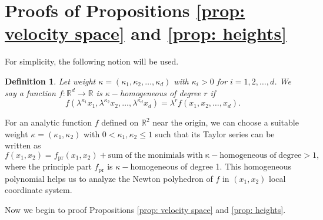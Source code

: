\documentclass[12pt]{amsart}
\newtheorem{definition}{Definition}[section]
\newcommand{\R}{\mathbb{R}}
\begin{document}
   


 



 \section{Proofs of Propositions \ref{prop: velocity space} and \ref{prop: heights}}\label{sec3}

For simplicity, the following notion will be used.
\begin{definition}
	Let weight $\kappa=\left(\kappa_{1},\kappa_{2},\dots,\kappa_{d}\right)$ with $\kappa_{i}>0$ for $i=1,2,\dots,d$. We say a function $f:\R^{d}\to\R$ is $\kappa-$homogeneous of degree $r$ if
    \begin{equation*}
		f\left(\lambda^{\kappa_{1}}x_{1},\lambda^{\kappa_{2}}x_{2},\dots,\lambda^{\kappa_{d}}x_{d}\right)=\lambda^{r}f\left(x_{1},x_{2},\dots,x_{d}\right).
	\end{equation*}
\end{definition}
For an analytic function $f$ defined on $\R^{2}$ near the origin, we can choose a suitable weight $\kappa=\left(\kappa_{1},\kappa_{2}\right)$ with $0<\kappa_{1},\kappa_{2}\leq1$ such that its Taylor series can be written as
\begin{equation*}
    f\left(x_{1},x_{2}\right)=f_{\mathrm{pr}}\left(x_{1},x_{2}\right)+\mathrm{sum\;of\;the\;monimials\;with\;\kappa-homogeneous\;of\;degree>1},
\end{equation*}
where the principle part $f_{\mathrm{pr}}$ is $\kappa-$homogeneous of degree 1. This homogeneous polynomial helps us to analyze the Newton polyhedron of $f$ in $\left(x_{1},x_{2}\right)$ local coordinate system.

 
Now we begin to proof Propositions \ref{prop: velocity space} and \ref{prop: heights}. 
 
\end{document}
